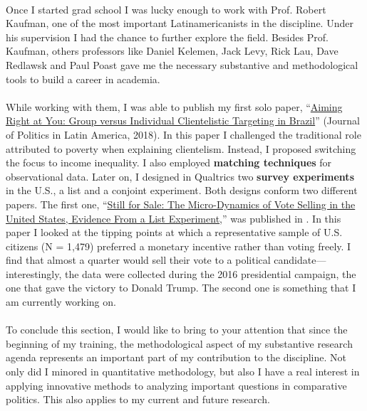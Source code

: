 \documentclass[letterpaper]{article}
\begin{document}
\paragraph{}Once I started grad school I was lucky enough to work with Prof. Robert Kaufman, one of the most important Latinamericanists in the discipline. Under his supervision I had the chance to further explore the field. Besides Prof. Kaufman, others professors like Daniel Kelemen, Jack Levy, Rick Lau, Dave Redlawsk and Paul Poast gave me the necessary substantive and methodological tools to build a career in academia.

\paragraph{}While working with them, I was able to publish my first solo paper, ``\href{https://journals.sub.uni-hamburg.de/giga/jpla/article/view/1121/1128}{Aiming Right at You: Group versus Individual Clientelistic Targeting in Brazil}'' (Journal of Politics in Latin America, 2018). In this paper I challenged the traditional role attributed to poverty when explaining clientelism. Instead, I proposed switching the focus to income inequality. I also employed {\bf matching techniques} for observational data. Later on, I designed in Qualtrics two {\bf survey experiments} in the U.S., a list and a conjoint experiment. Both designs conform two different papers. The first one, ``\href{https://github.com/hbahamonde/Vote_Selling/raw/master/Bahamonde_VoteSellingUS.pdf}{Still for Sale: The Micro-Dynamics of Vote Selling in the United States, Evidence From a List Experiment},'' was published in {\unskip}. In this paper I looked at the tipping points at which a representative sample of U.S. citizens (N = 1,479) preferred a monetary incentive rather than voting freely. I find that almost a quarter would sell their vote to a political candidate---interestingly, the data were collected during the 2016 presidential campaign, the one that gave the victory to Donald Trump. The second one is something that I am currently working on.

\paragraph{}To conclude this section, I would like to bring to your attention that since the beginning of my training, the methodological aspect of my substantive research agenda represents an important part of my contribution to the discipline. Not only did I minored in quantitative methodology, but also I have a real interest in applying innovative methods to analyzing important questions in comparative politics. This also applies to my current and future research.
\end{document}
